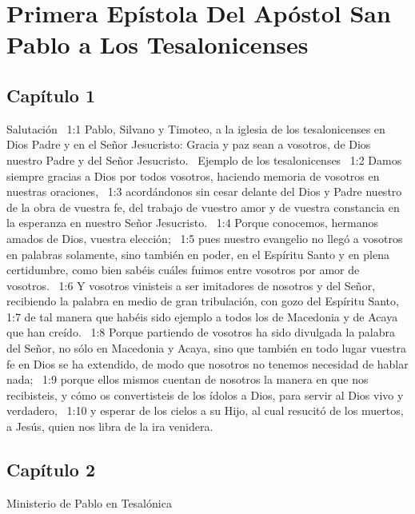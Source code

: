 \chapter{Primera Epístola Del Apóstol San Pablo a Los Tesalonicenses}


\section*{Capítulo 1}
Salutación  
1:1 Pablo, Silvano y Timoteo, a la iglesia de los tesalonicenses en Dios Padre y en el Señor Jesucristo: Gracia y paz sean a vosotros, de Dios nuestro Padre y del Señor Jesucristo.  
Ejemplo de los tesalonicenses  
1:2 Damos siempre gracias a Dios por todos vosotros, haciendo memoria de vosotros en nuestras oraciones,  
1:3 acordándonos sin cesar delante del Dios y Padre nuestro de la obra de vuestra fe, del trabajo de vuestro amor y de vuestra constancia en la esperanza en nuestro Señor Jesucristo.  
1:4 Porque conocemos, hermanos amados de Dios, vuestra elección;  
1:5 pues nuestro evangelio no llegó a vosotros en palabras solamente, sino también en poder, en el Espíritu Santo y en plena certidumbre, como bien sabéis cuáles fuimos entre vosotros por amor de vosotros.  
1:6 Y vosotros vinisteis a ser imitadores de nosotros y del Señor, recibiendo la palabra en medio de gran tribulación, con gozo del Espíritu Santo,  
1:7 de tal manera que habéis sido ejemplo a todos los de Macedonia y de Acaya que han creído.  
1:8 Porque partiendo de vosotros ha sido divulgada la palabra del Señor, no sólo en Macedonia y Acaya, sino que también en todo lugar vuestra fe en Dios se ha extendido, de modo que nosotros no tenemos necesidad de hablar nada;  
1:9 porque ellos mismos cuentan de nosotros la manera en que nos recibisteis, y cómo os convertisteis de los ídolos a Dios, para servir al Dios vivo y verdadero,  
1:10 y esperar de los cielos a su Hijo, al cual resucitó de los muertos, a Jesús, quien nos libra de la ira venidera.  
\section*{Capítulo 2 }
Ministerio de Pablo en Tesalónica  

